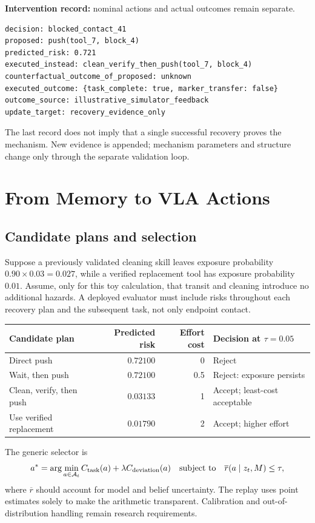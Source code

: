\documentclass[10pt]{article}
\begin{document}
\textbf{Intervention record:} nominal actions and actual outcomes remain separate.
\begin{lstlisting}
decision: blocked_contact_41
proposed: push(tool_7, block_4)
predicted_risk: 0.721
executed_instead: clean_verify_then_push(tool_7, block_4)
counterfactual_outcome_of_proposed: unknown
executed_outcome: {task_complete: true, marker_transfer: false}
outcome_source: illustrative_simulator_feedback
update_target: recovery_evidence_only
\end{lstlisting}
The last record does not imply that a single successful recovery proves the mechanism. New evidence is appended; mechanism parameters and structure change only through the separate validation loop.

\newpage
\section{From Memory to VLA Actions}
\subsection{Candidate plans and selection}
Suppose a previously validated cleaning skill leaves exposure probability $0.90\times0.03=0.027$, while a verified replacement tool has exposure probability $0.01$. Assume, only for this toy calculation, that transit and cleaning introduce no additional hazards. A deployed evaluator must include risks throughout each recovery plan and the subsequent task, not only endpoint contact.

\begin{center}
\begin{tabular}{lrrl}
\toprule
Candidate plan & Predicted risk & Effort cost & Decision at $\tau=0.05$ \\
\midrule
Direct push & $0.72100$ & 0 & Reject \\
Wait, then push & $0.72100$ & 0.5 & Reject: exposure persists \\
Clean, verify, then push & $0.03133$ & 1 & Accept; least-cost acceptable \\
Use verified replacement & $0.01790$ & 2 & Accept; higher effort \\
\bottomrule
\end{tabular}
\end{center}

The generic selector is
\[
a^* = \arg\min_{a\in\mathcal A_t} C_{\rm task}(a)+\lambda C_{\rm deviation}(a)
\quad\text{subject to}\quad \overline r(a\mid z_t,M)\leq\tau,
\]
where $\overline r$ should account for model and belief uncertainty. The replay uses point estimates solely to make the arithmetic transparent. Calibration and out-of-distribution handling remain research requirements.
\end{document}
